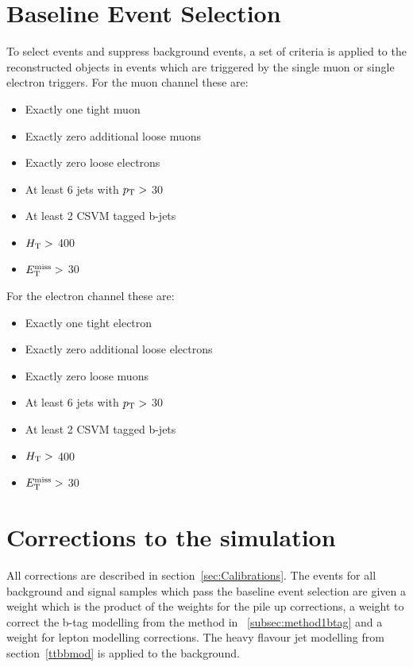 \section{Baseline Event Selection}
\label{sec:baseline}
To select \tttt events and suppress background events, a set of criteria is applied to the reconstructed objects in events which are triggered by the single muon or single electron triggers.
For the muon channel these are:
\begin{itemize}
\setlength\itemsep{0em}
\item Exactly one tight muon
\item Exactly zero additional loose muons
\item Exactly zero loose electrons
\item At least 6 jets with $p_{\mathrm{T}} >$ 30 \GeV
\item At least 2 CSVM tagged b-jets
\item $H_{\mathrm{T}} > $ 400 \GeV 
\item $E_{\mathrm{T}}^{\text{miss}} > $ 30 \GeV 
\end{itemize}
For the electron channel these are:
\begin{itemize}
\itemsep0em 
\item Exactly one tight electron
\item Exactly zero additional loose electrons
\item Exactly zero loose muons
\item At least 6 jets with $p_{\mathrm{T}} >$ 30 \GeV
\item At least 2 CSVM tagged b-jets
\item $H_{\mathrm{T}} > $ 400 \GeV 
\item $E_{\mathrm{T}}^{\text{miss}} > $ 30 \GeV 
\end{itemize}

\section{Corrections to the simulation}
\label{sec:Calibrations8}
All corrections are described in section~\ref{sec:Calibrations}.
The events for all background and signal samples which pass the baseline event selection are given a weight which is the product of the weights for the pile up corrections, a weight to correct the b-tag modelling from the method in ~\ref{subsec:method1btag} and a weight for lepton modelling corrections. The heavy flavour jet modelling from section~\ref{ttbbmod} is applied to the \ttbar background.





